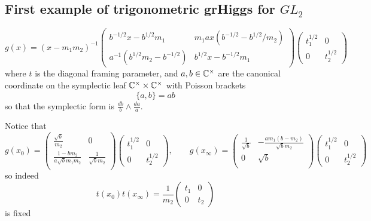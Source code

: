 \documentclass[12pt,psamsfonts,reqno]{amsart}
\begin{document}
  
\subsection{First example of trigonometric grHiggs for $GL_2$}


\begin{equation}
g(x) = (x - m_1m_2)^{-1}   \begin{pmatrix}
    b^{-1/2} x - b^{1/2} m_1 & m_1 a x (b^{-1/2} - b^{1/2}/m_2) \\
    a^{-1} (b^{1/2} m_2 - b^{-1/2})  & b^{1/2} x - b^{-1/2} m_1 
  \end{pmatrix}
  \begin{pmatrix}
    t_1^{1/2} & 0\\
    0 & t_2^{1/2} 
  \end{pmatrix}
\end{equation}
where $t$ is the diagonal framing parameter, and $a, b \in \mathbb C^{\times}$ are the canonical coordinate on
the symplectic leaf $\mathbb C^{\times} \times \mathbb C^{\times}$ with Poisson brackets
\begin{equation}
  \{ a, b \} =  ab 
\end{equation}
so that the symplectic form is $\frac{db}{b} \wedge \frac {da}{a}$.

Notice that
\begin{equation}
  g(x_0) = \begin{pmatrix}
 \frac{\sqrt{b}}{m_2} & 0 \\
 \frac{1-b m_2}{a \sqrt{b} m_1 m_2} & \frac{1}{\sqrt{b} m_2} \\
\end{pmatrix}  \begin{pmatrix}
    t_1^{1/2} & 0\\
    0 & t_2^{1/2} 
  \end{pmatrix}, \qquad 
g(x_\infty) = 
\begin{pmatrix}
 \frac{1}{\sqrt{b}} & -\frac{a m_1 \left(b-m_2\right)}{\sqrt{b} m_2} \\
 0 & \sqrt{b} \\
\end{pmatrix}  \begin{pmatrix}
    t_1^{1/2} & 0\\
    0 & t_2^{1/2} 
  \end{pmatrix}
\end{equation}
so indeed
\begin{equation}
  t(x_0) t(x_\infty) =  \frac{1}{m_2}  \begin{pmatrix}
    t_1 & 0\\
    0 & t_2
  \end{pmatrix}
\end{equation}
is fixed 
\end{document}
